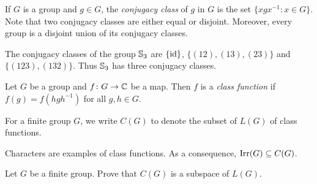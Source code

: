 
If $G$ is a group and $g\in G$, the \emph{conjugacy class} of $g$ in $G$ 
is the set $\{xgx^{-1}:x\in G\}$. Note that two conjugacy classes are either equal or disjoint. Moreover, 
every group is a disjoint union of its conjugacy classes. 

\begin{example}
    The conjugacy classes of the group $\mathbb{S}_3$ are  
    $\{\operatorname{id}\}$, $\{(12),(13),(23)\}$ and $\{(123),(132)\}$. Thus $\mathbb{S}_3$ has three conjugacy classes. 
\end{example}

\begin{definition}
	Let $G$ be a group and 
	$f\colon G\to\mathbb{C}$ be a map. Then $f$ is a \emph{class function} if
	$f(g)=f(hgh^{-1})$ for all $g,h\in G$. 	 
\end{definition}

For a finite group $G$, we write $C(G)$ to denote the subset of $L(G)$ of class functions.

Characters are examples of class functions. As a consequence, 
$\operatorname{Irr}(G)\subseteq C(G)$. 



\begin{exercise}
Let $G$ be a finite group. Prove that $C(G)$ is a subspace of $L(G)$. 
\end{exercise}

